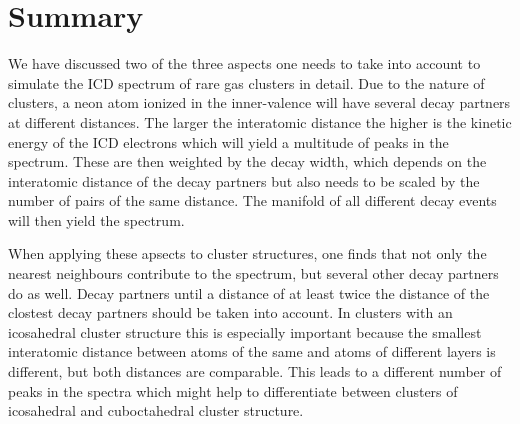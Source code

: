 \section{Summary}
\label{sec:summary}

We have discussed two of the three aspects one needs to take into account
to simulate the ICD spectrum of rare gas clusters in detail. Due to the nature
of clusters, a neon atom ionized in the inner-valence will have several decay
partners at different distances. The larger the interatomic distance the higher
is the kinetic energy of the ICD electrons which will yield a multitude of
peaks in the spectrum. These are then weighted by the decay width, which
depends on the interatomic distance of the decay partners but also needs
to be scaled by the number of pairs of the same distance.
The manifold of all different decay events will then yield the spectrum.

When applying these apsects to cluster structures, one finds that not only
the nearest neighbours contribute to the spectrum, but several other decay
partners do as well. Decay partners until a distance of at least twice the
distance of the clostest decay partners should be taken into account.
In clusters with an icosahedral cluster structure this is especially important
because the smallest interatomic distance between atoms of the same and atoms
of different layers is different, but both distances are comparable.
This leads to a different number of peaks in the spectra which might help to
differentiate between clusters of icosahedral and cuboctahedral cluster structure.

